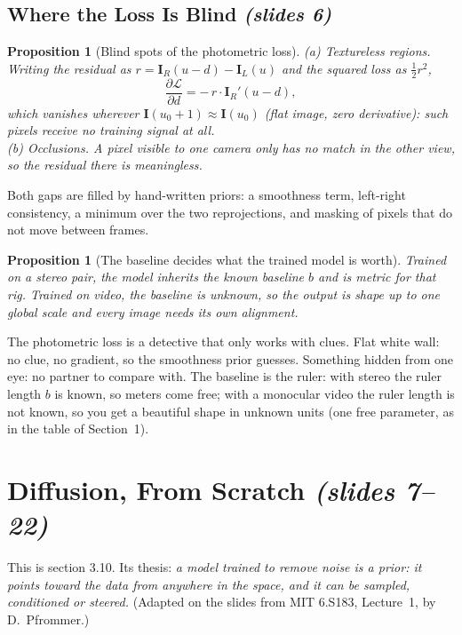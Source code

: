 \documentclass[11pt,a4paper]{article}
\numberwithin{equation}{section}
\newcommand{\slides}[1]{\texorpdfstring{\;\emph{(slides #1)}}{ (slides #1)}}
\theoremstyle{plain}
\newtheorem{proposition}[theorem]{Proposition}
\theoremstyle{definition}
\begin{document}
\subsection{Where the Loss Is Blind \slides{6}}
\begin{proposition}[Blind spots of the photometric loss]
(a) \emph{Textureless regions.} Writing the residual as $r=\bm I_R(u-d)-\bm I_L(u)$ and the squared loss as $\tfrac12 r^2$,
\begin{equation}
\frac{\partial \mathcal L}{\partial d}=-\,r\cdot \bm I_R'(u-d),
\end{equation}
which vanishes wherever $\bm I(u_0+1)\approx \bm I(u_0)$ (flat image, zero derivative): such pixels receive \emph{no training signal at all}.\\
(b) \emph{Occlusions.} A pixel visible to one camera only has no match in the other view, so the residual there is meaningless.
\end{proposition}

Both gaps are filled by hand-written priors: a smoothness term, left-right consistency, a minimum over the two reprojections, and masking of pixels that do not move between frames.

\begin{proposition}[The baseline decides what the trained model is worth]
Trained on a stereo pair, the model inherits the known baseline $b$ and is metric \emph{for that rig}. Trained on video, the baseline is unknown, so the output is shape up to one global scale and every image needs its own alignment.
\end{proposition}

\begin{intuition}
The photometric loss is a detective that only works with clues. Flat white wall: no clue, no gradient, so the smoothness prior guesses. Something hidden from one eye: no partner to compare with. The baseline is the ruler: with stereo the ruler length $b$ is known, so meters come free; with a monocular video the ruler length is not known, so you get a beautiful shape in unknown units (one free parameter, as in the table of Section~1).
\end{intuition}

\section{Diffusion, From Scratch \slides{7--22}}
This is section 3.10. Its thesis: \emph{a model trained to remove noise is a prior: it points toward the data from anywhere in the space, and it can be sampled, conditioned or steered.} (Adapted on the slides from MIT 6.S183, Lecture~1, by D.~Pfrommer.)
\end{document}
